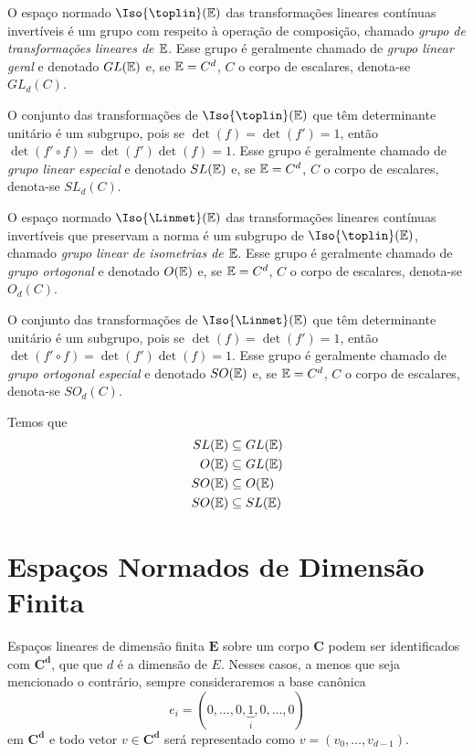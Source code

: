 O espaço normado $\Iso{\toplin}(\E)$ das transformações lineares contínuas invertíveis é um grupo com respeito à operação de composição, chamado \emph{grupo de transformações lineares de $\mathbb{E}$}. Esse grupo é geralmente chamado de \emph{grupo linear geral} e denotado $GL(\mathbb{E})$ e, se $\mathbb{E}=C^d$, $C$ o corpo de escalares, denota-se $GL_d(C)$.

O conjunto das transformações de $\Iso{\toplin}(\E)$ que têm determinante unitário é um subgrupo, pois se $\det(f)=\det(f')=1$, então $\det(f' \circ f)=\det(f')\det(f)=1$. Esse grupo é geralmente chamado de \emph{grupo linear especial} e denotado $SL(\mathbb{E})$ e, se $\mathbb{E}=C^d$, $C$ o corpo de escalares, denota-se $SL_d(C)$.

O espaço normado $\Iso{\Linmet}(\E)$ das transformações lineares contínuas invertíveis que preservam a norma é um subgrupo de $\Iso{\toplin}(\E)$, chamado \emph{grupo linear de isometrias de $\mathbb{E}$}. Esse grupo é geralmente chamado de \emph{grupo ortogonal} e denotado $O(\mathbb{E})$ e, se $\mathbb{E}=C^d$, $C$ o corpo de escalares, denota-se $O_d(C)$.

O conjunto das transformações de $\Iso{\Linmet}(\E)$ que têm determinante unitário é um subgrupo, pois se $\det(f)=\det(f')=1$, então $\det(f' \circ f)=\det(f')\det(f)=1$. Esse grupo é geralmente chamado de \emph{grupo ortogonal especial} e denotado $SO(\mathbb{E})$ e, se $\mathbb{E}=C^d$, $C$ o corpo de escalares, denota-se $SO_d(C)$.

Temos que
	\begin{align*}
	SL(\mathbb{E}) &\subseteq GL(\mathbb{E}) \\
	O(\mathbb{E}) &\subseteq GL(\mathbb{E}) \\
	SO(\mathbb{E}) &\subseteq O(\mathbb{E}) \\
	SO(\mathbb{E}) &\subseteq SL(\mathbb{E})
	\end{align*}

\section{Espaços Normados de Dimensão Finita}

Espaços lineares de dimensão finita $\bm E$ sobre um corpo $\bm C$ podem ser identificados com $\bm{C^d}$, que que $d$ é a dimensão de $E$. Nesses casos, a menos que seja mencionado o contrário, sempre consideraremos a base canônica
	\begin{equation*}
	e_i = (0,\dots,0,\underbrace{1}_i,0,\dots,0)
	\end{equation*}
em $\bm{C^d}$ e todo vetor $v \in \bm{C^d}$ será representado como $v=(v_0,\dots,v_{d-1})$.

